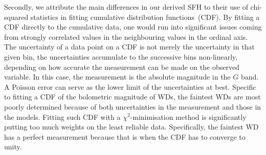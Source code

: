 \documentclass[fleqn,usenatbib]{mnras}
\begin{document}
Secondly, we attribute the main differences in our derived SFH to their
use of chi-squared statistics in fitting cumulative distribution
functions~(CDF). By fitting a CDF directly to the cumulative data, one would
run into significant issues coming from strongly correlated values in the
neighbouring values in the ordinal axis. The uncertainty of a data point on
a CDF is not merely the uncertainty in that given bin, the uncertainties
accumulate to the successive bins non-linearly, depending on how accurate the
measurement can be made on the observed variable. In this case, the measurement is the absolute
magnitude in the $G$ band. A Poisson error can serve as the lower limit of
the uncertainties at best. Specific to fitting a CDF of the bolometric
magnitude of WDs, the faintest WDs are most poorly determined because of both
uncertainties in the measurement and those in the models. Fitting such CDF
with a $\chi^2$-minimisation method is significantly putting too much weights
on the least reliable data. Specifically, the faintest WD has a perfect
measurement because that is when the CDF has to converge to unity.
\end{document}
